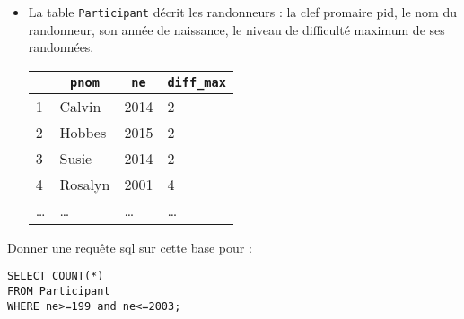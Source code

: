 \documentclass[11pt,a4paper]{article}
\begin{document}
\begin{Exercise}[title={Randonnée},origin={\bac \; d'après {\sc ccmp 2021 - pc, pc psi} (Partie 1)}]
\begin{itemize}
\begin{center}
\begin{tabular}{|l|l|l|l|l|}
				      \hline
			      \end{tabular}
		      \end{center}
		\item La table {\tt Participant} décrit les randonneurs : la clef promaire {\ttb pid}, le nom du randonneur, son année de naissance, le niveau de difficulté maximum de ses randonnées.
		      \begin{center}
			      \begin{tabular}{|l|l|l|l|}
				      \hline
				      \rowcolor{lightgray} \multicolumn{1}{|c|}{\ttb{\underline{pid}}} & \multicolumn{1}{|c|}{\textbf{\tt pnom}} & \multicolumn{1}{|c|}{\textbf{\tt ne}} & \multicolumn{1}{|c|}{\tt diff\_max} \\
				      \hline
				      1                                                                & Calvin                                  & 2014                                  & 2                                   \\
				      \hline
				      2                                                                & Hobbes                                  & 2015                                  & 2                                   \\
				      \hline
				      3                                                                & Susie                                   & 2014                                  & 2                                   \\
				      \hline
				      4                                                                & Rosalyn                                 & 2001                                  & 4                                   \\
				      \hline
				      \dots                                                            & \dots                                   & \dots                                 & \dots                               \\
				      \hline
			      \end{tabular}
		      \end{center}
	\end{itemize}
	Donner une requête {\sc sql} sur cette base pour :
	\begin{verbatim}
SELECT COUNT(*) 
FROM Participant 
WHERE ne>=199 and ne<=2003;
	\end{verbatim}

\end{Exercise}
\end{document}
